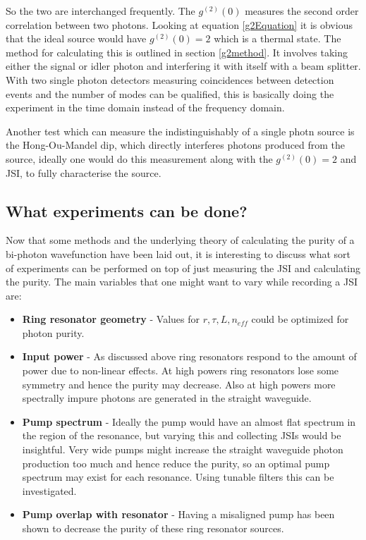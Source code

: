 So the two are interchanged frequently. The $g^{(2)}(0)$ measures the second order correlation between two photons. Looking at equation \ref{g2Equation} it is obvious that the ideal source would have $g^{(2)}(0)=2$ which is a thermal state\cite{paul_photon_1982}. The method for calculating this is outlined in section \ref{g2method}. It involves taking either the signal or idler photon and interfering it with itself with a beam splitter. With two single photon detectors measuring coincidences between detection events and the number of modes can be qualified, this is basically doing the experiment in the time domain instead of the frequency domain.

Another test which can measure the indistinguishably of a single photn source is the Hong-Ou-Mandel dip\cite{hong_measurement_1987}, which directly interferes photons produced from the source, ideally one would do this measurement along with the $g^{(2)}(0)=2$ and JSI, to fully characterise the source. 


\subsection{What experiments can be done?}
Now that some methods and the underlying theory of calculating the purity of a bi-photon wavefunction have been laid out, it is interesting to discuss what sort of experiments can be performed on top of just measuring the JSI and calculating the purity. The main variables that one might want to vary while recording a JSI are:
\begin{itemize}
	\item \textbf{Ring resonator geometry} - Values for $r,\tau,L,n_{eff}$ could be optimized for photon purity. 
	\item \textbf{Input power} - As discussed above ring resonators respond to the amount of power due to non-linear effects. At high powers ring resonators lose some symmetry and hence the purity may decrease. Also at high powers more spectrally impure photons are generated in the straight waveguide. 
	\item \textbf{Pump spectrum} - Ideally the pump would have an almost flat spectrum in the region of the resonance, but varying this and collecting JSIs would  be insightful. Very wide pumps might increase the straight waveguide photon production too much and hence reduce the purity, so an optimal pump spectrum may exist for each resonance. Using tunable filters this can be investigated.
	\item \textbf{Pump overlap with resonator} - Having a misaligned pump has been shown to decrease the purity of these ring resonator sources. \cite{scammell_indistinguishable_2014}
\end{itemize}